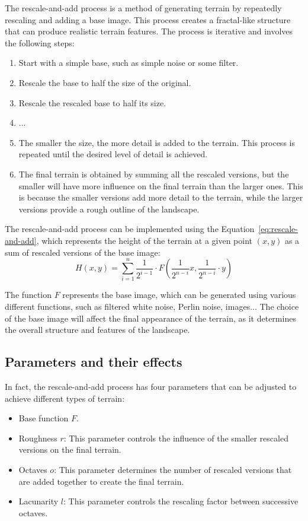 The rescale-and-add process is a method of generating terrain by repeatedly rescaling and adding a base image. This process creates a fractal-like structure that can produce realistic terrain features. The process is iterative and involves the following steps:
\begin{enumerate}
    \item Start with a simple base, such as simple noise or some filter.
    \item Rescale the base to half the size of the original.
    \item Rescale the rescaled base to half its size.
    \item ...
    \item The smaller the size, the more detail is added to the terrain. This process is repeated until the desired level of detail is achieved.
    \item The final terrain is obtained by summing all the rescaled versions, but the smaller will have more influence on the final terrain than the larger ones. This is because the smaller versions add more detail to the terrain, while the larger versions provide a rough outline of the landscape.
\end{enumerate}

The rescale-and-add process can be implemented using the Equation~\eqref{eq:rescale-and-add}, which represents the height of the terrain at a given point $(x, y)$ as a sum of rescaled versions of the base image:
\begin{equation}
    H(x, y) = \sum_{i=1}^{n} \frac{1}{2^{i-1}} \cdot F\left( \frac{1}{2^{n-i}} x, \frac{1}{2^{n-i}}\cdot y \right)
    \label{eq:rescale-and-add}
\end{equation}

The function $F$ represents the base image, which can be generated using various different functions, such as filtered white noise, Perlin noise, images... The choice of the base image will affect the final appearance of the terrain, as it determines the overall structure and features of the landscape.

\subsection{Parameters and their effects}

In fact, the rescale-and-add process has four parameters that can be adjusted to achieve different types of terrain:
\begin{itemize}
    \item Base function $F$.
    \item Roughness $r$: This parameter controls the influence of the smaller rescaled versions on the final terrain.
    \item Octaves $o$: This parameter determines the number of rescaled versions that are added together to create the final terrain.
    \item Lacunarity $l$: This parameter controls the rescaling factor between successive octaves.
\end{itemize}

